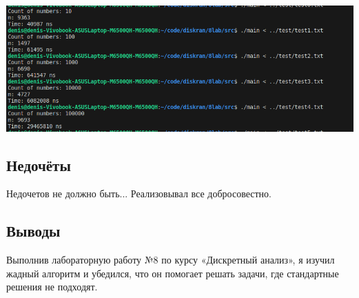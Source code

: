 \documentclass[12pt]{article}
\begin{document}
\includegraphics[width=7in]{test.png}

\subsection*{Недочёты}

Недочетов не должно быть... Реализовывал все добросовестно.

\subsection*{Выводы}

Выполнив лабораторную работу №8 по курсу «Дискретный анализ», я изучил
жадный алгоритм и убедился, что он помогает решать задачи, где стандартные решения не подходят.
\end{document}
